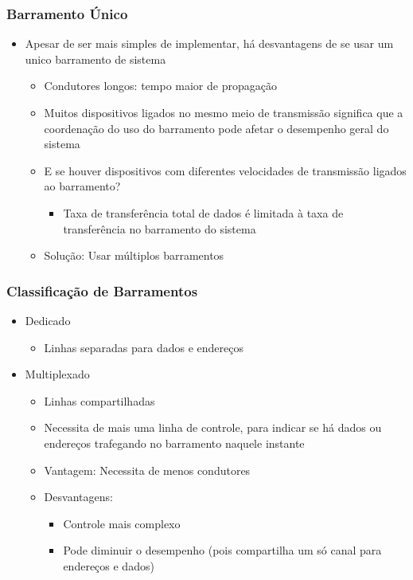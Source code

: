 \documentclass[12pt]{article}
\begin{document}
        \subsubsection{Barramento Único}
        \begin{itemize}
            \item Apesar de ser mais simples de implementar, há desvantagens de se 
            usar um unico barramento de sistema
            \begin{itemize}
                \item Condutores longos: tempo maior de propagação
                \item Muitos dispositivos ligados no mesmo meio de transmissão 
                significa que a coordenação do uso do barramento pode afetar o 
                desempenho geral do sistema
                \item E se houver dispositivos com diferentes velocidades de 
                transmissão ligados ao barramento?
                \begin{itemize}
                    \item Taxa de transferência total de dados é limitada à taxa de 
                    transferência no barramento do sistema
                \end{itemize}
                \item Solução: Usar múltiplos barramentos
            \end{itemize}
        \end{itemize}
        \subsubsection{Classificação de Barramentos}
        \begin{itemize}
            \item Dedicado
            \begin{itemize}
                \item Linhas separadas para dados e endereços
            \end{itemize}
            \item Multiplexado
            \begin{itemize}
                \item Linhas compartilhadas
                \item Necessita de mais uma linha de controle, para indicar se 
                há dados ou endereços trafegando no barramento naquele instante
                \item Vantagem: Necessita de menos condutores
                \item Desvantagens:
                \begin{itemize}
                    \item Controle mais complexo
                    \item Pode diminuir o desempenho (pois compartilha um só 
                    canal para endereços e dados)
                \end{itemize}
            \end{itemize}
        \end{itemize}
\end{document}
